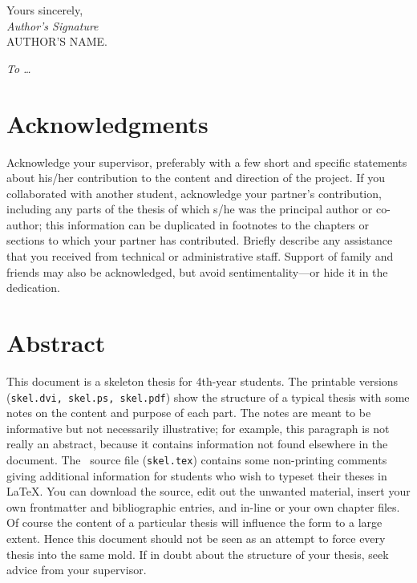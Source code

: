 \documentclass[12pt,openany,a4paper]{book}
\renewcommand{\baselinestretch}{1.2}	%
\begin{document}
\begin{flushright}
	Yours sincerely,\\
	\medskip
	\emph{Author's Signature}\\
	\medskip
	AUTHOR'S NAME.
\end{flushright}

\cleardoublepage

\vspace*{70mm}
\begin{center}
\renewcommand{\baselinestretch}{1.0}
\sl
	To \ldots
\end{center}

\chapter{Acknowledgments}

Acknowledge your supervisor, preferably with a few short and specific
statements about his/her contribution to the content and direction of
the project.  If you collaborated with another student, acknowledge
your partner's contribution, including any parts of the thesis of
which s/he was the principal author or co-author; this information can
be duplicated in footnotes to the chapters or sections to which your
partner has contributed.  Briefly describe any assistance that you
received from technical or administrative staff.  Support of family
and friends may also be acknowledged, but avoid sentimentality---or
hide it in the dedication.

\cleardoublepage

\chapter{Abstract}


This document is a skeleton thesis for 4th-year students.  The
printable versions (\texttt{skel.dvi, skel.ps, skel.pdf})
show the structure of a typical thesis with some notes on the content
and purpose of each part.  The notes are meant to be informative but
not necessarily illustrative; for example, this paragraph is not
really an abstract, because it contains information not found
elsewhere in the document.  The \LaTeXe\ source file
(\texttt{skel.tex}) contains some non-printing comments giving
additional information for students who wish to typeset their theses
in \LaTeX.  You can download the source, edit out the unwanted
material, insert your own frontmatter and bibliographic entries, and
in-line or \verb++ your own chapter files.  Of course the
content of a particular thesis will influence the form to a large
extent.  Hence this document should not be seen as an attempt to force
every thesis into the same mold.  If in doubt about the structure of
your thesis, seek advice from your supervisor.
\end{document}
